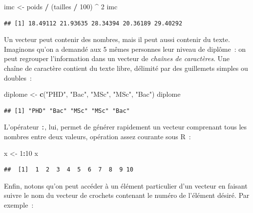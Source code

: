 \documentclass[
  12pt,
]{book}
\newenvironment{Shaded}{\begin{snugshade}}{\end{snugshade}}
\newcommand{\DecValTok}[1]{\textcolor[rgb]{0.00,0.00,0.81}{#1}}
\newcommand{\KeywordTok}[1]{\textcolor[rgb]{0.13,0.29,0.53}{\textbf{#1}}}
\newcommand{\NormalTok}[1]{#1}
\newcommand{\OperatorTok}[1]{\textcolor[rgb]{0.81,0.36,0.00}{\textbf{#1}}}
\newcommand{\StringTok}[1]{\textcolor[rgb]{0.31,0.60,0.02}{#1}}
\begin{document}
\begin{Shaded}
\begin{Highlighting}[]
\NormalTok{imc \textless{}{-}}\StringTok{ }\NormalTok{poids }\OperatorTok{/}\StringTok{ }\NormalTok{(tailles }\OperatorTok{/}\StringTok{ }\DecValTok{100}\NormalTok{) }\OperatorTok{\^{}}\StringTok{ }\DecValTok{2}
\NormalTok{imc}
\end{Highlighting}
\end{Shaded}

\begin{verbatim}
## [1] 18.49112 21.93635 28.34394 20.36189 29.40292
\end{verbatim}

Un vecteur peut contenir des nombres, mais il peut aussi contenir du texte. Imaginons qu'on a demandé aux 5 mêmes personnes leur niveau de diplôme~: on peut regrouper l'information dans un vecteur de \emph{chaînes de caractères}. Une chaîne de caractère contient du texte libre, délimité par des guillemets simples ou doubles~:

\begin{Shaded}
\begin{Highlighting}[]
\NormalTok{diplome \textless{}{-}}\StringTok{ }\KeywordTok{c}\NormalTok{(}\StringTok{"PHD"}\NormalTok{, }\StringTok{"Bac"}\NormalTok{, }\StringTok{"MSc"}\NormalTok{, }\StringTok{"MSc"}\NormalTok{, }\StringTok{"Bac"}\NormalTok{)}
\NormalTok{diplome}
\end{Highlighting}
\end{Shaded}

\begin{verbatim}
## [1] "PHD" "Bac" "MSc" "MSc" "Bac"
\end{verbatim}

L'opérateur \texttt{:}, lui, permet de générer rapidement un vecteur comprenant tous les nombres entre deux valeurs, opération assez courante sous R~:

\begin{Shaded}
\begin{Highlighting}[]
\NormalTok{x \textless{}{-}}\StringTok{ }\DecValTok{1}\OperatorTok{:}\DecValTok{10}
\NormalTok{x}
\end{Highlighting}
\end{Shaded}

\begin{verbatim}
##  [1]  1  2  3  4  5  6  7  8  9 10
\end{verbatim}

Enfin, notons qu'on peut accéder à un élément particulier d'un vecteur en faisant suivre le nom du vecteur de crochets contenant le numéro de l'élément désiré. Par exemple~:
\end{document}
